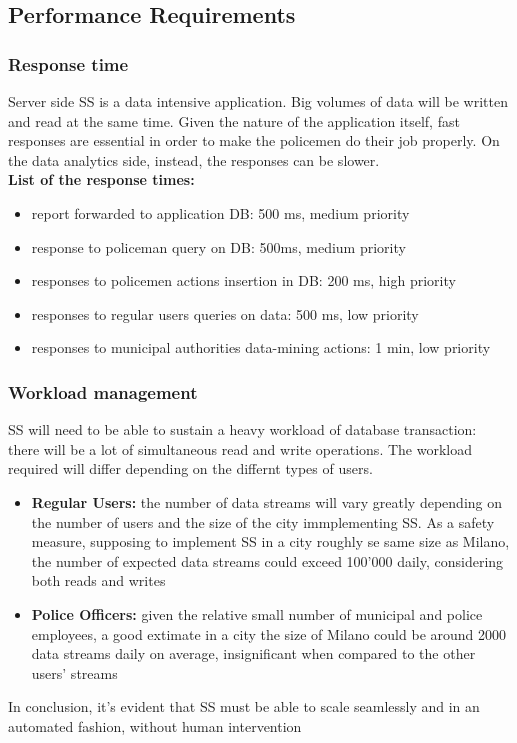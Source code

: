\subsection{Performance Requirements}

	\subsubsection{Response time}
	
Server side SS is a data intensive application. Big volumes of data  will be written and read at the same time. Given the nature of the application itself, fast responses are essential in order to make the policemen do their job properly. On the data analytics side, instead, the responses can be slower.\\

\textbf{List of the response times:}
\begin{itemize}
\item report forwarded to application DB: 500 ms, medium priority
\item response to policeman query on DB: 500ms, medium priority
\item responses to policemen actions insertion in DB: 200 ms, high priority
\item responses to regular users queries on data: 500 ms, low priority
\item responses to municipal authorities data-mining actions: 1 min, low priority
\end{itemize}
\subsubsection{Workload management}
SS will need to be able to sustain a heavy workload of database transaction: there will be a lot of simultaneous read and write operations. The workload required will differ depending on the differnt types of users.
\begin{itemize}
	\item \textbf{Regular Users:} the number of data streams will vary greatly depending on the number of users and the size of the city immplementing SS. As a safety measure, supposing to implement SS in a city roughly se same size as Milano, the number of expected data streams could exceed 100'000 daily, considering both reads and writes
	\item \textbf{Police Officers: } given the relative small number of municipal and police employees, a good extimate in a city the size of Milano could be around 2000 data streams daily on average, insignificant when compared to the other users' streams  
\end{itemize}
In conclusion, it's evident that SS must be able to scale seamlessly and in an automated fashion, without human intervention


